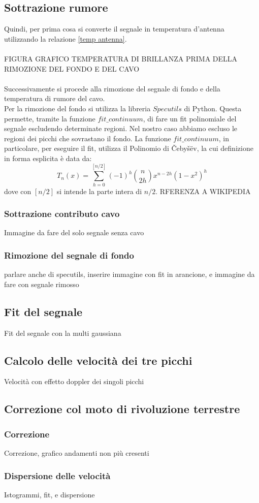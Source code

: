 \subsection{Sottrazione rumore}
Quindi, per prima cosa si converte il segnale in temperatura d'antenna utilizzando la relazione \eqref{temp antenna}.\\\\
FIGURA GRAFICO TEMPERATURA DI BRILLANZA PRIMA DELLA RIMOZIONE DEL FONDO E DEL CAVO\\\\
Successivamente si procede alla rimozione del segnale di fondo e della temperatura di rumore del cavo.\\
Per la rimozione del fondo si utilizza la libreria $Specutils$ di Python. Questa permette, tramite la funzione $fit\_continuum$, di fare un fit polinomiale del segnale escludendo determinate regioni. Nel nostro caso abbiamo escluso le regioni dei picchi che sovrastano il fondo. La funzione $fit\_continuum$, in particolare, per eseguire il fit, utilizza il Polinomio di Čebyšëv, la cui definizione in forma esplicita è data da:
\begin{equation}
    T_n(x)=\sum_{h=0}^{[n/2]} (-1)^h {n \choose 2h} x^{n-2h} (1-x^2)^h
\end{equation}
dove con $[n/2]$ si intende la parte intera di $n/2$. RFERENZA A WIKIPEDIA

\subsubsection{Sottrazione contributo cavo}
Immagine da fare del solo segnale senza cavo




\subsubsection{Rimozione del segnale di fondo}
parlare anche di specutils, inserire immagine con fit in arancione, e immagine da fare con segnale rimosso


\subsection{Fit del segnale}
Fit del segnale con la multi gaussiana

\subsection{Calcolo delle velocità dei tre picchi}
Velocità con effetto doppler dei singoli picchi

\subsection{Correzione col moto di rivoluzione terrestre}

\subsubsection{Correzione}
Correzione, grafico andamenti non più cresenti 


\subsubsection{Dispersione delle velocità}
Istogrammi, fit, e dispersione